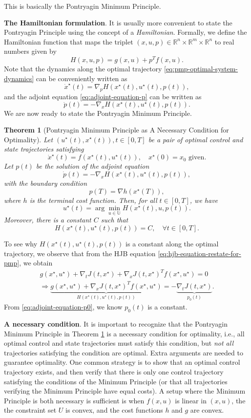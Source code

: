\documentclass[
]{book}
\newtheorem{theorem}{Theorem}[chapter]
\theoremstyle{definition}
\theoremstyle{definition}
\theoremstyle{definition}
\theoremstyle{definition}
\theoremstyle{remark}
\begin{document}
This is basically the Pontryagin Minimum Principle.

\textbf{The Hamiltonian formulation}. It is usually more convenient to state the Pontryagin Principle using the concept of a \emph{Hamiltonian}. Formally, we define the Hamiltonian function that maps the triplet \((x,u,p) \in \mathbb{R}^n \times \mathbb{R}^m \times \mathbb{R}^n\) to real numbers given by
\[
H(x,u,p) = g(x,u) + p^T f(x,u).
\]
Note that the dynamics along the optimal trajectory \eqref{eq:pmp-optimal-system-dynamics} can be conveniently written as
\[
\dot{x}^\star(t) = \nabla_p H(x^\star(t),u^\star(t),p(t)),
\]
and the adjoint equation \eqref{eq:adjoint-equation-p} can be written as
\[
\dot{p}(t) = - \nabla_x H(x^\star(t), u^\star(t), p(t)).
\]
We are now ready to state the Pontryagin Minimum Principle.

\begin{theorem}[Pontryagin Minimum Principle as A Necessary Condition for Optimality]
\protect\hypertarget{thm:pontryaginminimum}{}\label{thm:pontryaginminimum}Let \((u^\star(t), x^\star(t)), t \in [0,T]\) be a pair of optimal control and state trajectories satisfying
\[
\dot{x}^\star(t) = f(x^\star(t),u^\star(t)), \quad x^\star(0) = x_0 \text{ given}.
\]
Let \(p(t)\) be the solution of the adjoint equation
\[
\dot{p}(t) = - \nabla_x H(x^\star(t),u^\star(t),p(t)),
\]
with the boundary condition
\[
p(T) = \nabla h(x^\star(T)),
\]
where \(h\) is the terminal cost function. Then, for all \(t \in [0,T]\), we have
\[
u^\star(t) = \arg\min_{u \in \mathbb{U}} H(x^\star(t),u,p(t)).
\]
Moreover, there is a constant \(C\) such that
\[
H(x^\star(t),u^\star(t),p(t)) = C, \quad \forall t \in [0,T].
\]
\end{theorem}

To see why \(H(x^\star(t),u^\star(t),p(t))\) is a constant along the optimal trajectory, we observe that from the HJB equation \eqref{eq:hjb-equation-restate-for-pmp}, we obtain
\begin{align}
g(x^\star,u^\star) + \nabla_t J(t,x^\star) + \nabla_x J(t,x^\star)^T f(x^\star, u^\star) = 0 \\
\Longrightarrow \underbrace{g(x^\star,u^\star) + \nabla_x J(t,x^\star)^T f(x^\star, u^\star)}_{H(x^\star(t),u^\star(t),p(t))} = - \underbrace{\nabla_t J(t,x^\star)}_{p_0(t)}.
\end{align}
From \eqref{eq:adjoint-equation-p0}, we know \(p_0(t)\) is a constant.

\textbf{A necessary condition}. It is important to recognize that the Pontryagin Minimum Principle in Theorem \ref{thm:pontryaginminimum} is a necessary condition for optimality, i.e., all optimal control and state trajectories must satisfy this condition, but \emph{not all} trajectories satisfying the condition are optimal. Extra arguments are needed to guarantee optimality. One common strategy is to show that an optimal control trajectory exists, and then verify that there is only one control trajectory satisfying the conditions of the Minimum Principle (or that all trajectories verifying the Minimum Principle have equal costs). A setup where the Minimum Principle is both necessary is sufficient is when \(f(x,u)\) is linear in \((x,u)\), the the constraint set \(U\) is convex, and the cost functions \(h\) and \(g\) are convex.
\end{document}

